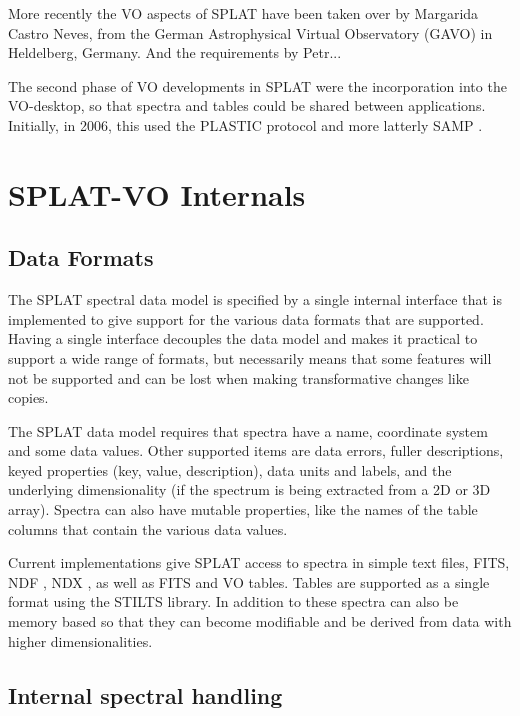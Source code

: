 \documentclass[final,authoryear,5p,times,twocolumn]{elsarticle}
\begin{document}
More recently the VO aspects of SPLAT have been taken over by Margarida Castro
Neves, from the German Astrophysical Virtual Observatory (GAVO) in Heldelberg, Germany.
And the requirements by Petr...

The second phase of VO developments in SPLAT were the incorporation
into the VO-desktop, so that spectra and tables could be shared
between applications.  Initially, in 2006, this used the PLASTIC
\citep{2007ASPC..376..511T} protocol and more latterly SAMP
\citep{2012ASPC..461..279T}.

\section{SPLAT-VO Internals}

\subsection{Data Formats}

The SPLAT spectral data model is specified by a single internal interface that
is implemented to give support for the various data formats that are
supported. Having a single interface decouples the data model and makes it
practical to support a wide range of formats, but necessarily means that some
features will not be supported and can be lost when making transformative
changes like copies.

The SPLAT data model requires that spectra have a name, coordinate system and
some data values. Other supported items are data errors, fuller descriptions,
keyed properties (key, value, description), data units and labels, and the
underlying dimensionality (if the spectrum is being extracted from a 2D or 3D
array). Spectra can also have mutable properties, like the names of the table
columns that contain the various data values.

Current implementations give SPLAT access to spectra in simple text
files, FITS, NDF \citep{ndfjenness}, NDX \citep{2003ASPC..295..221G},
as well as FITS and VO tables. Tables are supported as a single format
using the STILTS \citep[][]{2006ASPC..351..666T}
library. In addition to these spectra can also be memory based so that
they can become modifiable and be derived from data with higher
dimensionalities.

\subsection{Internal spectral handling}
\end{document}
